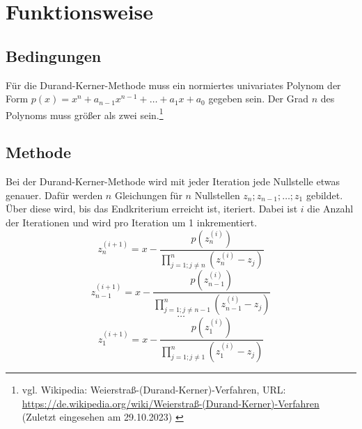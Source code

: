 \documentclass[12pt]{article}
\begin{document}
\section{Funktionsweise}
\subsection{Bedingungen}
Für die Durand-Kerner-Methode muss ein normiertes univariates Polynom der Form $p(x) = x^n + a_{n-1} x^{n-1} + \dots + a_1 x + a_0$ gegeben sein. Der Grad $n$ des Polynoms muss größer als zwei sein.\footnote{
    vgl. Wikipedia: Weierstraß-(Durand-Kerner)-Verfahren, URL: \url{https://de.wikipedia.org/wiki/Weierstraß-(Durand-Kerner)-Verfahren} (Zuletzt eingesehen am 29.10.2023)
    \label{ftn:Wikipedia-Weierstraß-Methode}
}

\subsection{Methode}
Bei der Durand-Kerner-Methode wird mit jeder Iteration jede Nullstelle etwas genauer. Dafür werden $n$ Gleichungen für $n$ Nullstellen $z_n;z_{n-1};\dots;z_1$ gebildet. Über diese wird, bis das Endkriterium erreicht ist, iteriert. Dabei ist $i$ die Anzahl der Iterationen und wird pro Iteration um 1 inkrementiert.
\[z_n^{(i+1)} = x - \frac{p(z_n^{(i)})}{\prod_{j=1;j\neq n}^{n}(z_n^{(i)}-z_j)}\]
\[z_{n-1}^{(i+1)} = x - \frac{p(z_{n-1}^{(i)})}{\prod_{j=1;j\neq n-1}^{n}(z_{n-1}^{(i)}-z_j)}\]
\vspace{0.25mm}
\[\dots\]
\[z_{1}^{(i+1)} = x - \frac{p(z_{1}^{(i)})}{\prod_{j=1;j\neq 1}^{n}(z_{1}^{(i)}-z_j)}\]
\end{document}

